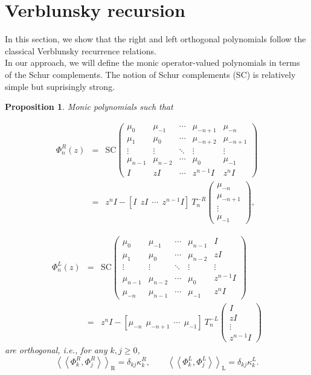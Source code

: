 \documentclass[11pt]{article}
\newtheorem{prop}{Proposition}[section]
\begin{document}
\section{Verblunsky recursion}

In this section, we show that the right and left orthogonal polynomials follow the classical Verblunsky recurrence relations.\\
\noindent In our approach, we will define the monic operator-valued polynomials in terms of the Schur complements. The notion of Schur complements (SC) is relatively simple but suprisingly strong.

\begin{prop}
Monic polynomials such that 

\begin{eqnarray*}
\Phi_{n}^{R}(z)&=&\mathrm{SC} 
\begin{pmatrix}
\mu_{0} & \mu_{-1} & \cdots & \mu_{-n+1} & \mu_{-n}\\
\mu_{1} & \mu_{0} & \cdots & \mu_{-n+2} & \mu_{-n+1}\\
\vdots & \vdots & \ddots & \vdots & \vdots\\
\mu_{n-1} & \mu_{n-2} & \cdots & \mu_{0}  & \mu_{-1}\\
I & zI & \cdots & z^{n-1}I & z^{n}I
\end{pmatrix} \\
&=& z^{n}I-[I~~zI~~ \cdots ~~ z^{n-1}I]~T^{-R}_{n}
\begin{pmatrix}
\mu_{-n}\\
\mu_{-n+1}\\
\vdots \\
\mu_{-1}
\end{pmatrix},
\end{eqnarray*}

\begin{eqnarray*}
\Phi_{n}^{L}(z)&=&\mathrm{SC} 
\begin{pmatrix}
\mu_{0} & \mu_{-1} & \cdots & \mu_{n-1} & I\\
\mu_{1} & \mu_{0} & \cdots & \mu_{n-2} & zI\\
\vdots & \vdots & \ddots & \vdots & \vdots\\
\mu_{n-1} & \mu_{n-2} & \cdots & \mu_{0}  & z^{n-1}I\\
\mu_{-n} & \mu_{n-1} & \cdots & \mu_{-1} & z^{n}I
\end{pmatrix} \\
&=& z^{n}I-[\mu_{-n} ~~ \mu_{-n+1} ~~ \cdots ~~ \mu_{-1}]~T^{-L}_{n}
\begin{pmatrix}
I\\
zI\\
\vdots \\
z^{n-1}I
\end{pmatrix}
\end{eqnarray*}
are orthogonal, i.e., for any $k,j \geq 0$,
$$
\left\langle \left\langle \Phi_{k}^{R},\Phi_{j}^{R}\right\rangle\right\rangle_{\mathrm{R}} = \delta_{kj}\kappa_{k}^{R},  \qquad
\left\langle \left\langle \Phi_{k}^{L},\Phi_{j}^{L}\right\rangle\right\rangle_{\mathrm{L}} =\delta_{kj}\kappa_{k}^{L}.
$$

\end{prop}
\end{document}
